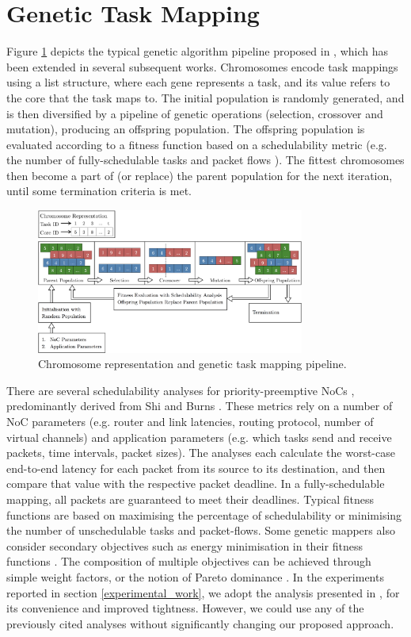 \documentclass[conference]{IEEEtran}
\begin{document}
\section{Genetic Task Mapping}\label{genetic_task_mapping}

Figure \ref{FIG-GA} depicts the typical genetic algorithm pipeline proposed in \cite{Mesidis11genetic}, which has been extended in several subsequent works. Chromosomes encode task mappings using a list structure, where each gene represents a task, and its value refers to the core that the task maps to. The initial population is randomly generated, and is then diversified by a pipeline of genetic operations (selection, crossover and mutation), producing an offspring population. The offspring population is evaluated according to a fitness function based on a schedulability metric (e.g. the number of fully-schedulable tasks and packet flows \cite{Mesidis11genetic, Ayari16}). The fittest chromosomes then become a part of (or replace) the parent population for the next iteration, until some termination criteria is met.

\begin{figure}[!h]
  \centering
  \includegraphics*[width=8.8cm,keepaspectratio]{img/ga}
  \caption{Chromosome representation and genetic task mapping pipeline.}
  \label{FIG-GA}
\end{figure}

There are several schedulability analyses for priority-preemptive NoCs \cite{kashif2015, indrusiak2016analysis, xiong2017}, predominantly derived from Shi and Burns \cite{Shi08}. These metrics rely on a number of NoC parameters (e.g. router and link latencies, routing protocol, number of virtual channels) and application parameters (e.g. which tasks send and receive packets, time intervals, packet sizes). The analyses each calculate the worst-case end-to-end latency for each packet from its source to its destination, and then compare that value with the respective packet deadline. In a fully-schedulable mapping, all packets are guaranteed to meet their deadlines. Typical fitness functions are based on maximising the percentage of schedulability or minimising the number of unschedulable tasks and packet-flows. Some genetic mappers also consider secondary objectives such as energy minimisation in their fitness functions \cite{Sayuti13real}. The composition of multiple objectives can be achieved through simple weight factors, or the notion of Pareto dominance \cite{deb2002fast}. In the experiments reported in section \ref{experimental_work}, we adopt the analysis presented in \cite{indrusiak2016analysis}, for its convenience and improved tightness. However, we could use any of the previously cited analyses without significantly changing our proposed approach.
\end{document}
